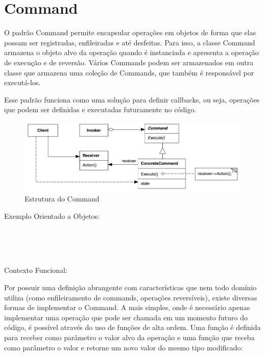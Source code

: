 \section{Command}

O padrão Command permite encapsular operações em objetos 
de forma que elas possam ser registradas, enfileiradas 
e até desfeitas. Para isso, a classe Command armazena o 
objeto alvo da operação quando é instanciada e apresenta 
a operação de execução e de reversão. Vários Commands 
podem ser armazenados em outra classe que armazena uma 
coleção de Commands, que também é responsável por 
executá-los.

Esse padrão funciona como uma solução para definir 
callbacks, ou seja, operações que podem ser definidas 
e executadas futuramente no código.

\begin{figure}[htb]
	\caption{\label{fig_grafico}Estrutura do Command}
	\begin{center}
	    \includegraphics[scale=0.5]{5_padroes-contexto-funcional/5.3_comportamentais/5.3.02_command/diagram.png}
	\end{center}
\end{figure}

Exemplo Orientado a Objetos:

\begin{lstlisting}[caption={Command Orientação a Objetos},label=oocommand]


    
\end{lstlisting}

Contexto Funcional:

Por possuir uma definição abrangente com características 
que nem todo domínio utiliza (como enfileiramento de 
commands, operações reversíveis), existe diversas formas 
de implementar o Command. A mais simples, onde é necessário 
apenas implementar uma operação que pode ser chamada em 
um momento futuro do código, é possível através do uso 
de funções de alta ordem. Uma função é definida para 
receber como parâmetro o valor alvo da operação e uma 
função que receba como parâmetro o valor e retorne um 
novo valor do mesmo tipo modificado:

